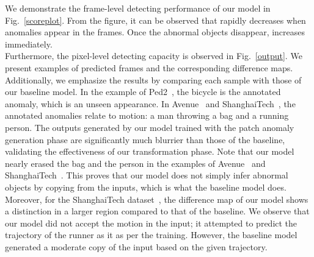 \documentclass[10pt,twocolumn,letterpaper]{article}
\begin{document}
\vspace{0.3em}
We demonstrate the frame-level detecting performance of our model in Fig.~\ref{scoreplot}. From the figure, it can be observed that  rapidly decreases when anomalies appear in the frames. Once the abnormal objects disappear,  increases immediately.\\
\indent Furthermore, the pixel-level detecting capacity is observed in Fig.~\ref{output}. We present examples of predicted frames and the corresponding difference maps. Additionally, we emphasize the results by comparing each sample with those of our baseline model. In the example of Ped2~\cite{mahadevan2010anomaly}, the bicycle is the annotated anomaly, which is an unseen appearance. In Avenue~\cite{lu2013abnormal} and ShanghaiTech~\cite{luo2017revisit}, the annotated anomalies relate to motion: a man throwing a bag and a running person. The outputs generated by our model trained with the patch anomaly generation phase are significantly much blurrier than those of the baseline, validating the effectiveness of our transformation phase. Note that our model nearly erased the bag and the person in the examples of Avenue~\cite{lu2013abnormal} and ShanghaiTech~\cite{luo2017revisit}. This proves that our model does not simply infer abnormal objects by copying from the inputs, which is what the baseline model does. Moreover, for the ShanghaiTech dataset~\cite{luo2017revisit}, the difference map of our model shows a distinction in a larger region compared to that of the baseline. We observe that our model did not accept the motion in the input; it attempted to predict the trajectory of the runner as it as per the training. However, the baseline model generated a moderate copy of the input based on the given trajectory. 
\vspace{-0.2cm}
\end{document}
